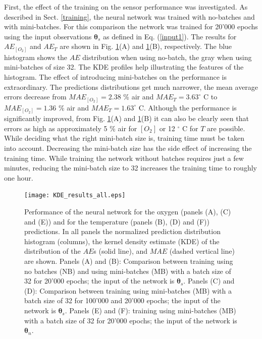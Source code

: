 \documentclass[9pt,twocolumn,twoside,pdftex]{optica}
\begin{document}
First, the effect of the training on the sensor performance was investigated. As described in Sect. \ref{training}, the neural network was trained with no-batches and with mini-batches. For this comparison the network was trained for 20'000 epochs using the input observations ${\pmb \theta}_s$ as defined in Eq. (\ref{input1}). The results for $AE_{[O_2]}$ and $AE_T$ are shown in Fig. \ref{fig:KDE_results_all}(A) and \ref{fig:KDE_results_all}(B), respectively. The blue histogram shows the $AE$ distribution when using no-batch, the gray when using mini-batches of size 32. The KDE profiles help illustrating the features of the histogram. The effect of introducing mini-batches on the performance is extraordinary. The predictions distributions get much narrower, the mean average errors decrease from $MAE_{[O_2]}=2.38$ \% air and $MAE_{T}=3.63^\circ$ C to $MAE_{[O_2]}=1.36$ \% air and $MAE_{T}=1.63^\circ$ C. Although the performance is significantly improved, from Fig. \ref{fig:KDE_results_all}(A) and \ref{fig:KDE_results_all}(B) it can also be clearly seen that errors as high as approximately 5 \% air for $[O_2]$ or 12 $^\circ$ C for $T$ are possible. While deciding what the right mini-batch size is, training time must be taken into account. Decreasing the mini-batch size has the side effect of increasing the training time. While training the network without batches requires just a few minutes, reducing the mini-batch size to 32 increases the training time to roughly one hour.

\begin{figure}[htbp]
\centering
\texttt{[image: KDE\_results\_all.eps]}
\caption{Performance of the neural network for the oxygen (panels (A), (C) and (E)) and for the temperature (panels (B), (D) and (F)) predictions. In all panels the normalized prediction distribution histogram (columns), the kernel density estimate (KDE) of the distribution of the $AE$s (solid line), and $MAE$ (dashed vertical line) are shown. Panels (A) and (B): Comparison between training using no batches (NB) and using mini-batches (MB) with a batch size of 32 for 20'000 epochs; the input of the network is ${\pmb \theta}_s$. Panels (C) and (D): Comparison between training using mini-batches (MB) with a batch size of 32 for 100'000 and 20'000 epochs; the input of the network is ${\pmb \theta}_s$. Panels (E) and (F): 
training using mini-batches (MB) with a batch size of 32 for 20'000 epochs; the input of the network is ${\pmb \theta}_n$.}
\label{fig:KDE_results_all}
\end{figure}
\end{document}
